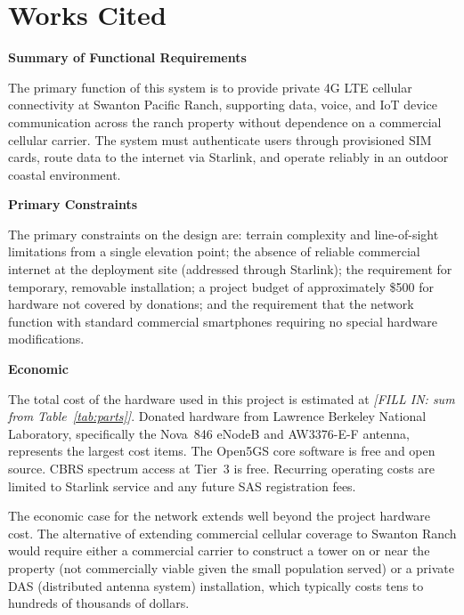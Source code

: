 \documentclass[
    left=1.5in,
    right=1.25in,
    top=1.25in,
    bottom=1.25in
]{CalPolySeniorProject}
\begin{document}
\clearpage
\section{Works Cited}
\printbibliography[heading=none]

\beginappendices


\textbf{Summary of Functional Requirements}

The primary function of this system is to provide private 4G LTE cellular
connectivity at Swanton Pacific Ranch, supporting data, voice, and IoT device
communication across the ranch property without dependence on a commercial
cellular carrier. The system must authenticate users through provisioned SIM
cards, route data to the internet via Starlink, and operate reliably in an
outdoor coastal environment.

\textbf{Primary Constraints}

The primary constraints on the design are: terrain complexity and line-of-sight
limitations from a single elevation point; the absence of reliable commercial
internet at the deployment site (addressed through Starlink); the requirement for
temporary, removable installation; a project budget of approximately \$500 for
hardware not covered by donations; and the requirement that the network function
with standard commercial smartphones requiring no special hardware modifications.

\textbf{Economic}

The total cost of the hardware used in this project is estimated at
\textit{[FILL IN: sum from Table~\ref{tab:parts}]}. Donated hardware from
Lawrence Berkeley National Laboratory, specifically the Nova~846 eNodeB and
AW3376-E-F antenna, represents the largest cost items. The Open5GS core
software is free and open source. CBRS spectrum access at Tier~3 is free.
Recurring operating costs are limited to Starlink service and any future SAS
registration fees.

The economic case for the network extends well beyond the project hardware cost.
The alternative of extending commercial cellular coverage to Swanton Ranch would
require either a commercial carrier to construct a tower on or near the property
(not commercially viable given the small population served) or a private DAS
(distributed antenna system) installation, which typically costs tens to hundreds
of thousands of dollars.
\end{document}
